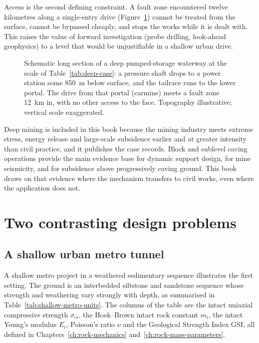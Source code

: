 Access is the second defining constraint. A fault zone encountered twelve
kilometres along a single-entry drive (Figure~\ref{fig:chal-deep-setting})
cannot be treated from the surface,
cannot be bypassed cheaply, and stops the works while it is dealt with.
This raises the value of forward investigation (probe drilling, look-ahead
geophysics) to a level that would be unjustifiable in a shallow urban
drive.

\begin{figure}[htbp]
\centering
{}
\caption{Schematic long section of a deep pumped-storage waterway at the scale
of Table~\ref{tab:deep-case}: a pressure shaft drops to a power station some
850~m below surface, and the tailrace runs to the lower portal. The drive from
that portal (carmine) meets a fault zone 12~km in, with no other access to the
face. Topography illustrative; vertical scale exaggerated.}
\label{fig:chal-deep-setting}
\end{figure}

Deep mining is included in this book because the mining
industry meets extreme stress, energy release and large-scale subsidence
earlier and at greater intensity than civil practice, and it publishes the
case records. Block and sublevel caving operations provide the main evidence
base for dynamic support design, for mine seismicity, and for subsidence above
progressively caving ground. This book draws on that evidence where the
mechanism transfers to civil works, even where the application does not.

\section{Two contrasting design problems}
\label{sec:contrasting-problems}

\subsection{A shallow urban metro tunnel}
\label{sec:case-shallow}

A shallow metro project in a weathered sedimentary sequence illustrates the
first setting. The ground is an interbedded siltstone and sandstone sequence
whose strength and weathering vary strongly with depth, as summarised in
Table~\ref{tab:shallow-metro-units}. The columns of the table are the intact
uniaxial compressive strength $\sigma_{ci}$, the Hoek--Brown intact rock
constant $m_i$, the intact Young's modulus $E_i$, Poisson's ratio $\nu$ and
the Geological Strength Index GSI, all defined in
Chapters~\ref{ch:rock-mechanics} and~\ref{ch:rock-mass-parameters}.

